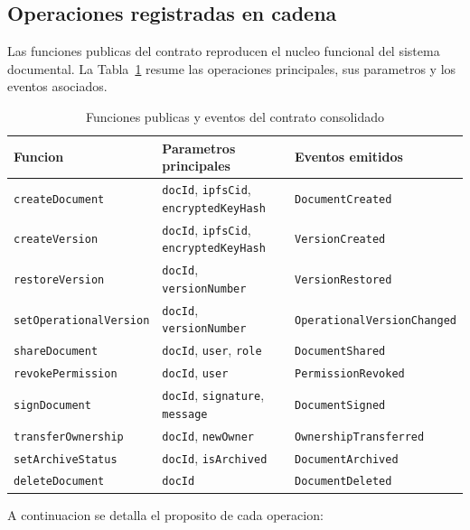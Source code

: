 \documentclass[11pt, a4paper]{article}
\begin{document}
\subsection{Operaciones registradas en cadena}

Las funciones publicas del contrato reproducen el nucleo funcional del sistema documental. La Tabla~\ref{tab:funciones-contrato} resume las operaciones principales, sus parametros y los eventos asociados.

\begin{table}[H]
    \centering
    \small
    \renewcommand{\arraystretch}{1.4}
    \begin{tabular}{@{}p{4.2cm}p{4.8cm}p{4.8cm}@{}}
    \toprule
    \textbf{Funcion} & \textbf{Parametros principales} & \textbf{Eventos emitidos} \\
    \midrule
    \texttt{createDocument} & \texttt{docId}, \texttt{ipfsCid}, \texttt{encryptedKeyHash} & \texttt{DocumentCreated} \\
    \texttt{createVersion} & \texttt{docId}, \texttt{ipfsCid}, \texttt{encryptedKeyHash} & \texttt{VersionCreated} \\
    \texttt{restoreVersion} & \texttt{docId}, \texttt{versionNumber} & \texttt{VersionRestored} \\
    \texttt{setOperationalVersion} & \texttt{docId}, \texttt{versionNumber} & \texttt{OperationalVersionChanged} \\
    \texttt{shareDocument} & \texttt{docId}, \texttt{user}, \texttt{role} & \texttt{DocumentShared} \\
    \texttt{revokePermission} & \texttt{docId}, \texttt{user} & \texttt{PermissionRevoked} \\
    \texttt{signDocument} & \texttt{docId}, \texttt{signature}, \texttt{message} & \texttt{DocumentSigned} \\
    \texttt{transferOwnership} & \texttt{docId}, \texttt{newOwner} & \texttt{OwnershipTransferred} \\
    \texttt{setArchiveStatus} & \texttt{docId}, \texttt{isArchived} & \texttt{DocumentArchived} \\
    \texttt{deleteDocument} & \texttt{docId} & \texttt{DocumentDeleted} \\
    \bottomrule
    \end{tabular}
    \caption{Funciones publicas y eventos del contrato consolidado}
    \label{tab:funciones-contrato}
\end{table}

A continuacion se detalla el proposito de cada operacion:
\end{document}
